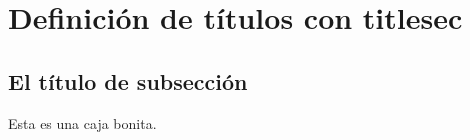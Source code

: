 \documentclass{article}%
\begin{document}
\section{Definición de títulos con titlesec}
\lipsum[3]
\subsection{El título de subsección}
\begin{tcolorbox}[colback = red!50!black, colframe = blue!75!red, title= mi caja]
Esta es una caja bonita.
\end{tcolorbox}
\end{document}
